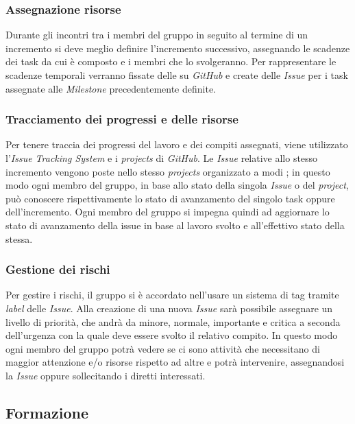 \subsubsection{Assegnazione risorse}

Durante gli incontri tra i membri del gruppo in seguito al termine di un incremento si deve meglio definire l'incremento successivo, 
assegnando le scadenze dei task da cui è composto e i membri che lo svolgeranno. Per rappresentare le scadenze temporali verranno fissate 
delle  su \emph{GitHub} e create delle \emph{Issue} per i task assegnate alle \emph{Milestone} precedentemente definite.

\subsubsection{Tracciamento dei progressi e delle risorse}
\label{ssub:pianificazione:tracciamento}
Per tenere traccia dei progressi del lavoro e dei compiti assegnati, viene utilizzato l'\emph{Issue Tracking System} e i 
\emph{projects} di \emph{GitHub}. Le \emph{Issue} relative allo stesso incremento vengono poste nello stesso \emph{projects} organizzato a 
modi ; in questo modo ogni membro del gruppo, in base allo stato della singola \emph{Issue} o del \emph{project}, 
può conoscere rispettivamente lo stato di avanzamento del singolo task oppure dell'incremento. Ogni membro del gruppo si impegna quindi ad 
aggiornare lo stato di avanzamento della issue in base al lavoro svolto e all'effettivo stato della stessa.

\subsubsection{Gestione dei rischi}

Per gestire i rischi, il gruppo si è accordato nell'usare un sistema di tag tramite \emph{label} delle \emph{Issue}. 
Alla creazione di una nuova \emph{Issue} sarà possibile assegnare un livello di priorità, che andrà da minore, normale, 
importante e critica a seconda dell'urgenza con la quale deve essere svolto il relativo compito. In questo modo ogni 
membro del gruppo potrà vedere se ci sono attività che necessitano di maggior attenzione e/o risorse rispetto ad altre 
e potrà intervenire, assegnandosi la \emph{Issue} oppure sollecitando i diretti interessati.

\subsection{Formazione}

